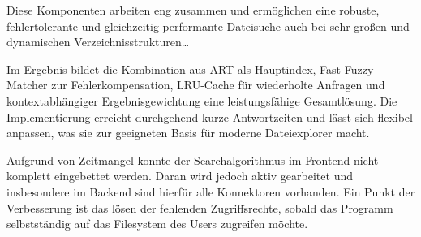 Diese Komponenten arbeiten eng zusammen und ermöglichen eine robuste, fehlertolerante und gleichzeitig performante Dateisuche auch bei sehr großen und dynamischen Verzeichnisstrukturen\dots

Im Ergebnis bildet die Kombination aus ART als Hauptindex, Fast Fuzzy Matcher zur Fehlerkompensation, LRU-Cache für wiederholte Anfragen und kontextabhängiger Ergebnisgewichtung eine leistungsfähige Gesamtlösung.
Die Implementierung erreicht durchgehend kurze Antwortzeiten und lässt sich flexibel anpassen, was sie zur geeigneten Basis für moderne Dateiexplorer macht.

Aufgrund von Zeitmangel konnte der Searchalgorithmus im Frontend nicht komplett eingebettet werden. Daran wird jedoch aktiv gearbeitet und insbesondere im Backend sind 
hierfür alle Konnektoren vorhanden. Ein Punkt der Verbesserung ist das lösen der fehlenden Zugriffsrechte, sobald das Programm selbstständig auf das Filesystem des Users zugreifen möchte.
